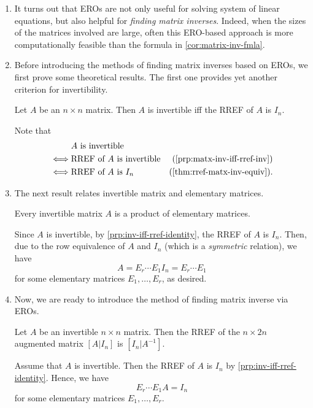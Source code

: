 \begin{enumerate}
\item It turns out that EROs are not only useful for solving system of linear
equations, but also helpful for \emph{finding matrix inverses}. Indeed, when
the sizes of the matrices involved are large, often this ERO-based approach is
more computationally feasible than the formula in \cref{cor:matrix-inv-fmla}.

\item Before introducing the methods of finding matrix inverses based on EROs,
we first prove some theoretical results. The first one provides yet another
criterion for invertibility.

\begin{proposition}
\label{prp:inv-iff-rref-identity}
Let \(A\) be an \(n\times n\) matrix. Then \(A\) is invertible iff the RREF of
\(A\) is \(I_n\).
\end{proposition}
\begin{pf}
Note that
\begin{align*}
&\text{\(A\) is invertible}\\
\iff&\text{RREF of \(A\) is invertible}&\text{(\cref{prp:matx-inv-iff-rref-inv})}\\
\iff&\text{RREF of \(A\) is \(I_n\)}&\text{(\cref{thm:rref-matx-inv-equiv})}.
\end{align*}
\end{pf}
\item The next result relates invertible matrix and elementary matrices.
\begin{corollary}
\label{cor:inv-matx-prod-elementary}
Every invertible matrix \(A\) is a product of elementary matrices.
\end{corollary}
\begin{pf}
Since \(A\) is invertible, by \cref{prp:inv-iff-rref-identity}, the RREF of
\(A\) is \(I_n\). Then, due to the row equivalence of \(A\) and \(I_n\) (which
is a \emph{symmetric} relation), we have
\[
A=E_r\dotsb E_1I_n=E_r\dotsb E_1
\]
for some elementary matrices \(E_1,\dotsc,E_r\), as desired.
\end{pf}
\item Now, we are ready to introduce the method of finding matrix inverse via
EROs.

\begin{theorem}
\label{thm:find-inv-ero}
Let \(A\) be an invertible \(n\times n\) matrix. Then the RREF of the \(n\times
2n\) augmented matrix \([A|I_n]\) is \([I_n|A^{-1}]\).
\end{theorem}
\begin{pf}
Assume that \(A\) is invertible. Then the RREF of \(A\) is \(I_n\) by
\cref{prp:inv-iff-rref-identity}. Hence, we have
\begin{equation}
\label{eq:inv-rref-identity}
E_r\dotsb E_1A=I_n
\end{equation}
for some elementary matrices \(E_1,\dotsc,E_r\).


\end{pf}
\end{enumerate}
